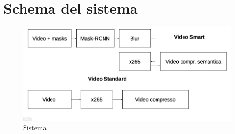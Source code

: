 \section{Schema del sistema}
\begin{figure}
   \includegraphics[width=\linewidth]{images/schema.png}
   \caption{Sistema}
   \label{fig:c}
\end{figure}
